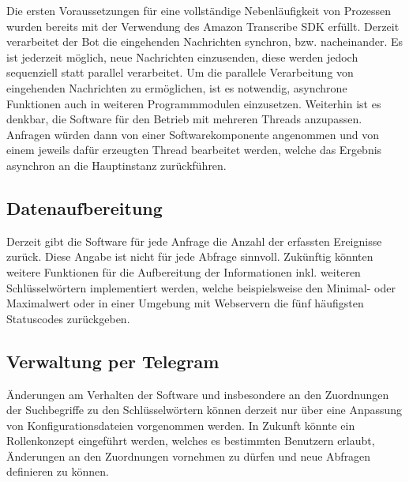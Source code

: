 Die ersten Voraussetzungen für eine vollständige Nebenläufigkeit von Prozessen wurden bereits mit der Verwendung des Amazon Transcribe SDK erfüllt. Derzeit verarbeitet der Bot die eingehenden Nachrichten synchron, bzw. nacheinander. Es ist jederzeit möglich, neue Nachrichten einzusenden, diese werden jedoch sequenziell statt parallel verarbeitet. Um die parallele Verarbeitung von eingehenden Nachrichten zu ermöglichen, ist es notwendig, asynchrone Funktionen auch in weiteren Programmmodulen einzusetzen. Weiterhin ist es denkbar, die Software für den Betrieb mit mehreren Threads anzupassen. Anfragen würden dann von einer Softwarekomponente angenommen und von einem jeweils dafür erzeugten Thread bearbeitet werden, welche das Ergebnis asynchron an die Hauptinstanz zurückführen. 

\subsection{Datenaufbereitung}

Derzeit gibt die Software für jede Anfrage die Anzahl der erfassten Ereignisse zurück. Diese Angabe ist nicht für jede Abfrage sinnvoll. Zukünftig könnten weitere Funktionen für die Aufbereitung der Informationen inkl. weiteren Schlüsselwörtern implementiert werden, welche beispielsweise den Minimal- oder Maximalwert oder in einer Umgebung mit Webservern die fünf häufigsten Statuscodes zurückgeben.

\subsection{Verwaltung per Telegram}

Änderungen am Verhalten der Software und insbesondere an den Zuordnungen der Suchbegriffe zu den Schlüsselwörtern können derzeit nur über eine Anpassung von Konfigurationsdateien vorgenommen werden. In Zukunft könnte ein Rollenkonzept eingeführt werden, welches es bestimmten Benutzern erlaubt, Änderungen an den Zuordnungen vornehmen zu dürfen und neue Abfragen definieren zu können.
